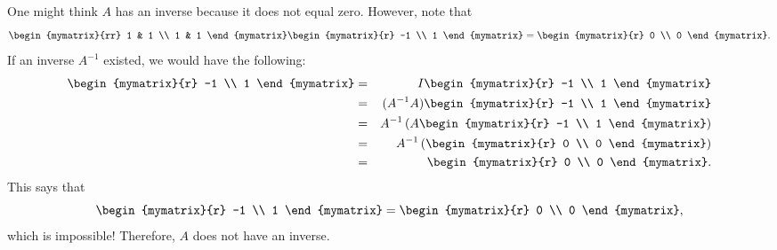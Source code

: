 \begin{solution}
  One might think $A$ has an inverse because it does not equal zero.
  However, note that
  \begin{equation*}
    \begin{mymatrix}{rr}
      1 & 1 \\
      1 & 1
    \end{mymatrix} \begin{mymatrix}{r}
      -1 \\
      1
    \end{mymatrix} =\begin{mymatrix}{r}
      0 \\
      0
    \end{mymatrix}.
  \end{equation*}
  If an inverse $A^{-1}$ existed, we would have the following:
  \begin{eqnarray*}
    \begin{mymatrix}{r}
      -1 \\
      1
    \end{mymatrix}
    &=&
        I\begin{mymatrix}{r}
          -1 \\
          1
        \end{mymatrix} \\
    &=&
        (A^{-1}A) \begin{mymatrix}{r}
          -1 \\
          1
        \end{mymatrix} \\
    &=&
        A^{-1}\paren{A\begin{mymatrix}{r}
            -1 \\
            1
          \end{mymatrix}} \\
    &=&
        A^{-1}\paren{\begin{mymatrix}{r}
            0 \\
            0
          \end{mymatrix}} \\
    &=&
        \begin{mymatrix}{r}
          0 \\
          0
        \end{mymatrix}.
\end{eqnarray*}
  This says that
  \begin{equation*}
    \begin{mymatrix}{r}
      -1 \\
      1
    \end{mymatrix}
    =
    \begin{mymatrix}{r}
      0 \\
      0
    \end{mymatrix},
  \end{equation*}
  which is impossible! Therefore, $A$ does not have an inverse.
\end{solution}

